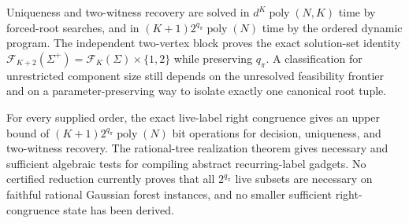 Uniqueness and two-witness recovery are solved in \(d^K\operatorname{poly}(N,K)\) time by forced-root searches, and in \((K+1)2^{q_\pi}\operatorname{poly}(N)\) time by the ordered dynamic program.  The independent two-vertex block proves the exact solution-set identity \(\mathcal F_{K+2}(\Sigma^+)=\mathcal F_K(\Sigma)\times\{1,2\}\) while preserving \(q_\pi\).  A classification for unrestricted component size still depends on the unresolved feasibility frontier and on a parameter-preserving way to isolate exactly one canonical root tuple.

For every supplied order, the exact live-label right congruence gives an upper bound of \((K+1)2^{q_\pi}\operatorname{poly}(N)\) bit operations for decision, uniqueness, and two-witness recovery.  The rational-tree realization theorem gives necessary and sufficient algebraic tests for compiling abstract recurring-label gadgets.  No certified reduction currently proves that all \(2^{q_\pi}\) live subsets are necessary on faithful rational Gaussian forest instances, and no smaller sufficient right-congruence state has been derived.
